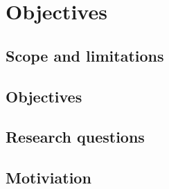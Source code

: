 \chapter{Objectives}

\section{Scope and limitations}

\section{Objectives}

\section{Research questions}

\section{Motiviation}